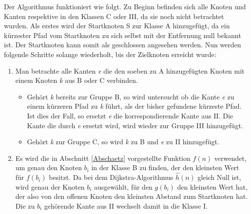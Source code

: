 		Der Algorithmus funktioniert wie folgt. Zu Beginn befinden sich alle Knoten und Kanten respektive in den Klassen C oder III, da sie noch nicht betrachtet wurden. Als erstes wird der Startknoten S zur Klasse A hinzugefügt, da ein kürzester Pfad vom Startknoten zu sich selbst mit der Entfernung null bekannt ist. Der Startknoten kann somit als geschlossen angesehen werden. Nun werden folgende Schritte solange wiederholt, bis der Zielknoten erreicht wurde:
		\begin{center}
			\begin{minipage}{0.8\linewidth}

				\begin{enumerate}
					\item Man betrachte alle Kanten \textit{e} die den soeben zu A hinzugefügten Knoten mit einem Knoten \textit{k} aus B oder C verbinden. 
					\begin{itemize}
						\item Gehört \textit{k} bereits zur Gruppe B, so wird untersucht ob die Kante \textit{e} zu einem kürzeren Pfad zu \textit{k} führt, als der bisher gefundene kürzeste Pfad. Ist dies der Fall, so ersetzt \textit{e} die korrespondierende Kante aus II. Die Kante die durch \textit{e} ersetzt wird, wird wieder zur Gruppe III hinzugefügt.
						\item Gehört \textit{k} zur Gruppe  C, so wird \textit{k} zu B und \textit{e} zu II hinzugefügt.
					\end{itemize}
					\item Es wird die in Abschnitt \ref{Abschaetz} vorgestellte Funktion $f(n)$ verwendet, um genau den Knoten $b_i$ in der Klasse B zu finden, der den kleinsten Wert für $f(b_i)$ besitzt. Da bei dem Dijkstra-Algorithmus $\hat{h}(n)$ gleich Null ist, wird genau der Knoten  $b_i$ ausgewählt, für den $g(b_i)$ den kleinsten Wert hat, der also von den offenen Knoten den kleinsten Abstand zum Startknoten hat. Die zu $b_i$ gehörende Kante  aus II wechselt damit in die Klasse I.
				\end{enumerate}
				
			\end{minipage}
		\end{center}
		
